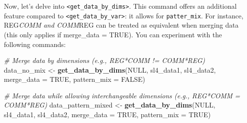 \documentclass[
]{article}
\newenvironment{Shaded}{\begin{snugshade}}{\end{snugshade}}
\newcommand{\AttributeTok}[1]{\textcolor[rgb]{0.13,0.29,0.53}{#1}}
\newcommand{\CommentTok}[1]{\textcolor[rgb]{0.56,0.35,0.01}{\textit{#1}}}
\newcommand{\ConstantTok}[1]{\textcolor[rgb]{0.56,0.35,0.01}{#1}}
\newcommand{\DecValTok}[1]{\textcolor[rgb]{0.00,0.00,0.81}{#1}}
\newcommand{\FunctionTok}[1]{\textcolor[rgb]{0.13,0.29,0.53}{\textbf{#1}}}
\newcommand{\NormalTok}[1]{#1}
\newcommand{\OtherTok}[1]{\textcolor[rgb]{0.56,0.35,0.01}{#1}}
\newcommand{\SpecialCharTok}[1]{\textcolor[rgb]{0.81,0.36,0.00}{\textbf{#1}}}
\newcommand{\StringTok}[1]{\textcolor[rgb]{0.31,0.60,0.02}{#1}}
\begin{document}
\begin{Shaded}
\end{Shaded}

Now, let's delve into
\texttt{\textless{}get\_data\_by\_dims\textgreater{}}. This command
offers an additional feature compared to
\texttt{\textless{}get\_data\_by\_var\textgreater{}}: it allows for
\texttt{patter\_mix}. For instance, REG\emph{COMM and COMM}REG can be
treated as equivalent when merging data (this only applies if
merge\_data = TRUE). You can experiment with the following commands:

\begin{Shaded}
\begin{Highlighting}[]
\CommentTok{\# Merge data by dimensions (e.g., REG*COMM != COMM*REG)}
\NormalTok{data\_no\_mix }\OtherTok{\textless{}{-}} \FunctionTok{get\_data\_by\_dims}\NormalTok{(}\ConstantTok{NULL}\NormalTok{, sl4\_data1, sl4\_data2, }
                                \AttributeTok{merge\_data =} \ConstantTok{TRUE}\NormalTok{, }
                                \AttributeTok{pattern\_mix =} \ConstantTok{FALSE}\NormalTok{)}

\CommentTok{\# Merge data while allowing interchangeable dimensions (e.g., REG*COMM = COMM*REG)}
\NormalTok{data\_pattern\_mixed }\OtherTok{\textless{}{-}} \FunctionTok{get\_data\_by\_dims}\NormalTok{(}\ConstantTok{NULL}\NormalTok{, sl4\_data1, sl4\_data2, }
                                       \AttributeTok{merge\_data =} \ConstantTok{TRUE}\NormalTok{, }
                                       \AttributeTok{pattern\_mix =} \ConstantTok{TRUE}\NormalTok{)}
\end{Highlighting}
\end{Shaded}
\end{document}
